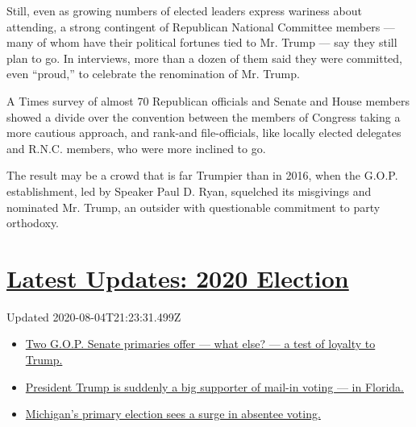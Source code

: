 Still, even as growing numbers of elected leaders express wariness about
attending, a strong contingent of Republican National Committee members
--- many of whom have their political fortunes tied to Mr. Trump --- say
they still plan to go. In interviews, more than a dozen of them said
they were committed, even ``proud,'' to celebrate the renomination of
Mr. Trump.

A Times survey of almost 70 Republican officials and Senate and House
members showed a divide over the convention between the members of
Congress taking a more cautious approach, and rank-and file-officials,
like locally elected delegates and R.N.C. members, who were more
inclined to go.

The result may be a crowd that is far Trumpier than in 2016, when the
G.O.P. establishment, led by Speaker Paul D. Ryan, squelched its
misgivings and nominated Mr. Trump, an outsider with questionable
commitment to party orthodoxy.

\hypertarget{latest-updates-2020-election}{%
\section{\texorpdfstring{\href{https://www.nytimes3xbfgragh.onion/2020/08/04/us/elections/primary-election-michigan-arizona-kansas.html?action=click\&pgtype=Article\&state=default\&region=MAIN_CONTENT_1\&context=storylines_live_updates}{Latest
Updates: 2020
Election}}{Latest Updates: 2020 Election}}\label{latest-updates-2020-election}}

Updated 2020-08-04T21:23:31.499Z

\begin{itemize}
\tightlist
\item
  \href{https://www.nytimes3xbfgragh.onion/2020/08/04/us/elections/primary-election-michigan-arizona-kansas.html?action=click\&pgtype=Article\&state=default\&region=MAIN_CONTENT_1\&context=storylines_live_updates\#link-3924dd44}{Two
  G.O.P. Senate primaries offer --- what else? --- a test of loyalty to
  Trump.}
\item
  \href{https://www.nytimes3xbfgragh.onion/2020/08/04/us/elections/primary-election-michigan-arizona-kansas.html?action=click\&pgtype=Article\&state=default\&region=MAIN_CONTENT_1\&context=storylines_live_updates\#link-32b39e33}{President
  Trump is suddenly a big supporter of mail-in voting --- in Florida.}
\item
  \href{https://www.nytimes3xbfgragh.onion/2020/08/04/us/elections/primary-election-michigan-arizona-kansas.html?action=click\&pgtype=Article\&state=default\&region=MAIN_CONTENT_1\&context=storylines_live_updates\#link-ab1004d}{Michigan's
  primary election sees a surge in absentee voting.}
\end{itemize}

